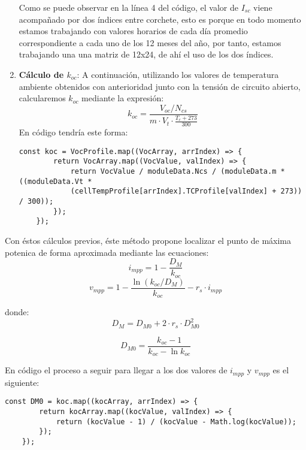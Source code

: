 \begin{enumerate}
Como se puede observar en la línea 4 del código, el valor de $I_{sc}$ viene acompañado por dos índices entre corchete, esto es porque en todo momento estamos trabajando con valores horarios de cada día promedio correspondiente a cada uno de los 12 meses del año, por tanto, estamos trabajando una una matriz de 12x24, de ahí el uso de los dos índices. 

\item \textbf{Cálculo de $k_{oc}$}: A continuación, utilizando los valores de temperatura ambiente obtenidos con anterioridad junto con la tensión de circuito abierto, calcularemos $k_{oc}$ mediante la expresión:
\begin{equation}
k_{oc} = \frac{V_{oc} / N_{cs}}{m \cdot V_t \cdot \frac{T_c + 273}{300}}
\end{equation}
En código tendría este forma:
\begin{lstlisting}[style=ES6, caption={Cálculo de $k_{oc}$}]
	const koc = VocProfile.map((VocArray, arrIndex) => {
		return VocArray.map((VocValue, valIndex) => {
			return VocValue / moduleData.Ncs / (moduleData.m * ((moduleData.Vt *
			(cellTempProfile[arrIndex].TCProfile[valIndex] + 273)) / 300));
		});
	});
\end{lstlisting} 
\end{enumerate}

Con éstos cálculos previos, éste método propone localizar el punto de máxima potenica de forma aproximada mediante las ecuaciones:
\begin{equation}
i_{mpp} = 1 - \frac{D_M}{k_{oc}}
\end{equation}
\begin{equation}
v_{mpp} = 1 - \frac{\ln(k_{oc}/D_M)}{k_{oc}}-r_s\cdot i_{mpp}
\end{equation}

donde:
\begin{equation}
D_M = D_{M0} + 2 \cdot r_s \cdot D_{M0}^2
\end{equation}

\begin{equation}
D_{M0} = \frac{k_{oc}-1}{k_{oc} - \ln k_{oc}}
\end{equation}

En código el proceso a seguir para llegar a los dos valores de $i_{mpp}$ y $v_{mpp}$ es el siguiente:

\begin{lstlisting}[style=ES6, caption={Cálculo de $D_{M0}$}]
	const DM0 = koc.map((kocArray, arrIndex) => {
		return kocArray.map((kocValue, valIndex) => {
			return (kocValue - 1) / (kocValue - Math.log(kocValue));
		});
	});
\end{lstlisting} 

